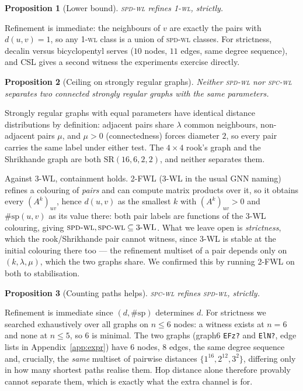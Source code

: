 \documentclass[11pt]{article}
\newtheorem{proposition}{Proposition}
\newcommand{\WL}{\textsc{1-wl}}
\newcommand{\SPD}{\textsc{spd-wl}}
\newcommand{\SPC}{\textsc{spc-wl}}
\begin{document}
\begin{proposition}[Lower bound]\label{prop:lower}
\SPD{} refines \WL{}, strictly.
\end{proposition}
Refinement is immediate: the neighbours of $v$ are exactly the pairs with $d(u,v)=1$, so any
\WL{} class is a union of \SPD{} classes. For strictness, decalin versus bicyclopentyl serves
($10$ nodes, $11$ edges, same degree sequence), and CSL gives a second witness the experiments
exercise directly.

\begin{proposition}[Ceiling on strongly regular graphs]\label{prop:upper}
Neither \SPD{} nor \SPC{} separates two \emph{connected} strongly regular graphs with the same
parameters.
\end{proposition}
Strongly regular graphs with equal parameters have identical distance distributions by
definition: adjacent pairs share $\lambda$ common neighbours, non-adjacent pairs $\mu$, and
$\mu>0$ (connectedness) forces diameter $2$, so every pair carries the same label under either
test. The $4\times4$ rook's graph and the Shrikhande graph are both $\mathrm{SR}(16,6,2,2)$, and
neither separates them.

Against 3-WL, containment holds. 2-FWL (3-WL in the usual GNN naming) refines a colouring of
\emph{pairs} and can compute matrix products over it, so it obtains every $(A^k)_{uv}$, hence
$d(u,v)$ as the smallest $k$ with $(A^k)_{uv}>0$ and $\#\mathrm{sp}(u,v)$ as its value there:
both pair labels are functions of the 3-WL colouring, giving $\SPD,\SPC\subseteq\text{3-WL}$.
What we leave open is \emph{strictness}, which the rook/Shrikhande pair cannot witness, since
3-WL is stable at the initial colouring there too --- the refinement multiset of a pair depends
only on $(k,\lambda,\mu)$, which the two graphs share. We confirmed this by running 2-FWL on
both to stabilisation.

\begin{proposition}[Counting paths helps]\label{prop:count}
\SPC{} refines \SPD{}, strictly.
\end{proposition}
Refinement is immediate since $(d,\#\mathrm{sp})$ determines $d$. For strictness we searched
exhaustively over all graphs on $n\le6$ nodes: a witness exists at $n=6$ and none at $n\le5$, so
$6$ is minimal. The two graphs (graph6 \texttt{EFz?} and \texttt{ElN?}, edge lists in
Appendix~\ref{app:expr}) have $6$ nodes, $8$ edges, the same degree sequence and, crucially, the
\emph{same} multiset of pairwise distances $\{1^{16},2^{12},3^{2}\}$, differing only in how many
shortest paths realise them. Hop distance alone therefore provably cannot separate them, which
is exactly what the extra channel is for.
\end{document}
